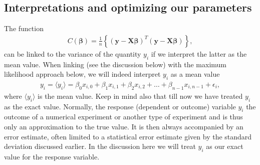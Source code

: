\documentclass[letterpaper,10pt,english]{sphinxmanual}
\begin{document}
\subsection{Interpretations and optimizing our parameters}
\label{\detokenize{chapter4:interpretations-and-optimizing-our-parameters}}
The function
\begin{equation*}
\begin{split}
C(\boldsymbol{\beta})=\frac{1}{n}\left\{\left(\boldsymbol{y}-\boldsymbol{X}\boldsymbol{\beta}\right)^T\left(\boldsymbol{y}-\boldsymbol{X}\boldsymbol{\beta}\right)\right\},
\end{split}
\end{equation*}
can be linked to the variance of the quantity \(y_i\) if we interpret the latter as the mean value.
When linking (see the discussion below) with the maximum likelihood approach below, we will indeed interpret \(y_i\) as a mean value
\begin{equation*}
\begin{split}
y_{i}=\langle y_i \rangle = \beta_0x_{i,0}+\beta_1x_{i,1}+\beta_2x_{i,2}+\dots+\beta_{n-1}x_{i,n-1}+\epsilon_i,
\end{split}
\end{equation*}
where \(\langle y_i \rangle\) is the mean value. Keep in mind also that
till now we have treated \(y_i\) as the exact value. Normally, the
response (dependent or outcome) variable \(y_i\) the outcome of a
numerical experiment or another type of experiment and is thus only an
approximation to the true value. It is then always accompanied by an
error estimate, often limited to a statistical error estimate given by
the standard deviation discussed earlier. In the discussion here we
will treat \(y_i\) as our exact value for the response variable.
\end{document}
